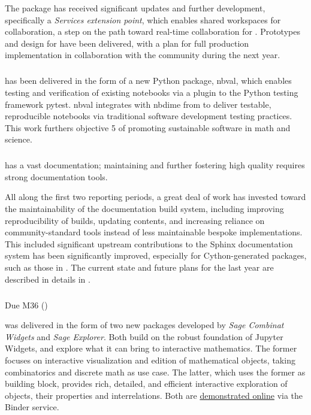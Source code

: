 The \JupyterHub package has received significant updates and further development, specifically a
\emph{Services extension point}, which enables shared workspaces for collaboration, a step on the path
toward real-time collaboration for .
Prototypes and design for  have been delivered,
with a plan for full production implementation in collaboration with the \Jupyter community during the next year.

\subparagraph{}

 has been delivered in the form of a new Python package, nbval,
which enables testing and verification of existing notebooks via a plugin to the Python testing
framework pytest. nbval integrates with nbdime from  to deliver
testable, reproducible notebooks via traditional software development testing practices.
This work furthers \ODK objective 5 of promoting sustainable software in math and science.

\subparagraph{}
\label{UI@sage-sphinx}

\Sage has a vast documentation; maintaining and further fostering high
quality requires strong documentation tools.

All along the first two reporting periods, a great deal of work has
invested toward the maintainability of the \Sage documentation build
system, including improving reproducibility of builds, updating
contents, and increasing reliance on community-standard tools instead
of less maintainable bespoke implementations. This included
significant upstream contributions to the Sphinx documentation system
has been significantly improved, especially for Cython-generated
packages, such as those in . The current state
and future plans for the last year are described in details in
.

\subparagraph{} Due M36 ()

 was delivered in the
form of two new packages developed by \ODK \emph{Sage Combinat
  Widgets} and \emph{Sage Explorer}. Both build on the robust
foundation of Jupyter Widgets, and explore what it can bring to
interactive mathematics. The former focuses on interactive
visualization and edition of mathematical objects, taking
combinatorics and discrete math as use case. The latter, which uses
the former as building block, provides rich, detailed, and efficient
interactive exploration of objects, their properties and
interrelations. Both are
\href{https://github.com/sagemath/sage-explorer}{demonstrated online}
via the Binder service.

